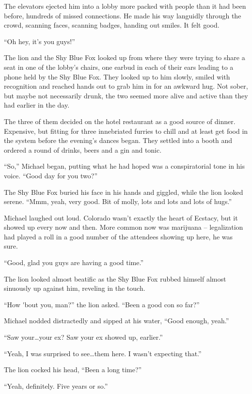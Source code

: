 The elevators ejected him into a lobby more packed with people than it had been before, hundreds of missed connections.  He made his way languidly through the crowd, scanning faces, scanning badges, handing out smiles.  It felt good.

``Oh hey, it's you guys!''

The lion and the Shy Blue Fox looked up from where they were trying to share a seat in one of the lobby's chairs, one earbud in each of their ears leading to a phone held by the Shy Blue Fox.  They looked up to him slowly, smiled with recognition and reached hands out to grab him in for an awkward hug.  Not sober, but maybe not necessarily drunk, the two seemed more alive and active than they had earlier in the day.

The three of them decided on the hotel restaurant as a good source of dinner.  Expensive, but fitting for three innebriated furries to chill and at least get food in the system before the evening's dances began.  They settled into a booth and ordered a round of drinks, beers and a gin and tonic.

``So,'' Michael began, putting what he had hoped was a conspiratorial tone in his voice.  ``Good day for you two?''

The Shy Blue Fox buried his face in his hands and giggled, while the lion looked serene.  ``Mmm, yeah, very good.  Bit of molly, lots and lots and lots of hugs.''

Michael laughed out loud.  Colorado wasn't exactly the heart of Ecstacy, but it showed up every now and then.  More common now was marijuana -- legalization had played a roll in a good number of the attendees showing up here, he was sure.

``Good, glad you guys are having a good time.''

The lion looked almost beatific as the Shy Blue Fox rubbed himself almost sinuously up against him, reveling in the touch.

``How \'{}bout you, man?'' the lion asked.  ``Been a good con so far?''

Michael nodded distractedly and sipped at his water, ``Good enough, yeah.''

``Saw your\ldots{}your ex?  Saw your ex showed up, earlier.''

``Yeah, I was surprised to see\ldots{}them here.  I wasn't expecting that.''

The lion cocked his head, ``Been a long time?''

``Yeah, definitely.  Five years or so.''

